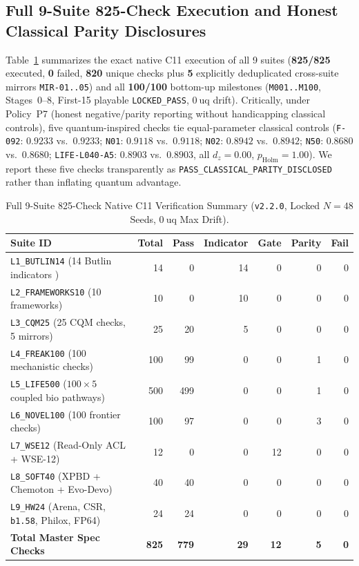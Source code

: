 \documentclass[11pt,reqno]{amsart}
\theoremstyle{remark}
\begin{document}
\subsection{Full 9-Suite 825-Check Execution and Honest Classical Parity Disclosures}
\label{subsec:suites}

Table~\ref{tab:suites} summarizes the exact native C11 execution of all 9 suites (\textbf{825/825} executed, \textbf{0} failed, \textbf{820} unique checks plus \textbf{5} explicitly deduplicated cross-suite mirrors \texttt{MIR-01..05}) and all \textbf{100/100} bottom-up milestones (\texttt{M001..M100}, Stages~0--8, First-15 playable \texttt{LOCKED\_PASS}, $0~\text{uq}$ drift). Critically, under Policy~P7 (honest negative/parity reporting without handicapping classical controls), five quantum-inspired checks tie equal-parameter classical controls (\texttt{F-092}: $0.9233$ vs.\ $0.9233$; \texttt{N01}: $0.9118$ vs.\ $0.9118$; \texttt{N02}: $0.8942$ vs.\ $0.8942$; \texttt{N50}: $0.8680$ vs.\ $0.8680$; \texttt{LIFE-L040-A5}: $0.8903$ vs.\ $0.8903$, all $d_z = 0.00$, $p_{\text{Holm}} = 1.00$). We report these five checks transparently as \texttt{PASS\_CLASSICAL\_PARITY\_DISCLOSED} rather than inflating quantum advantage.

\begin{table}[ht]
\centering
\caption{Full 9-Suite 825-Check Native C11 Verification Summary (\texttt{v2.2.0}, Locked $N=48$ Seeds, $0~\text{uq}$ Max Drift).}
\label{tab:suites}
\footnotesize
\setlength{\tabcolsep}{4pt}
\begin{tabular}{@{} l r r r r r r @{}}
\toprule
\textbf{Suite ID} & \textbf{Total} & \textbf{Pass} & \textbf{Indicator} & \textbf{Gate} & \textbf{Parity} & \textbf{Fail} \\
\midrule
\texttt{L1\_BUTLIN14} (14 Butlin indicators \cite{butlin2023}) & 14 & 0 & 14 & 0 & 0 & 0 \\
\texttt{L2\_FRAMEWORKS10} (10 frameworks) & 10 & 0 & 10 & 0 & 0 & 0 \\
\texttt{L3\_CQM25} (25 CQM checks, 5 mirrors) & 25 & 20 & 5 & 0 & 0 & 0 \\
\texttt{L4\_FREAK100} (100 mechanistic checks) & 100 & 99 & 0 & 0 & 1 & 0 \\
\texttt{L5\_LIFE500} ($100 \times 5$ coupled bio pathways) & 500 & 499 & 0 & 0 & 1 & 0 \\
\texttt{L6\_NOVEL100} (100 frontier checks) & 100 & 97 & 0 & 0 & 3 & 0 \\
\texttt{L7\_WSE12} (Read-Only ACL + WSE-12) & 12 & 0 & 0 & 12 & 0 & 0 \\
\texttt{L8\_SOFT40} (XPBD + Chemoton + Evo-Devo) & 40 & 40 & 0 & 0 & 0 & 0 \\
\texttt{L9\_HW24} (Arena, CSR, \texttt{b1.58}, Philox, FP64) & 24 & 24 & 0 & 0 & 0 & 0 \\
\midrule
\textbf{Total Master Spec Checks} & \textbf{825} & \textbf{779} & \textbf{29} & \textbf{12} & \textbf{5} & \textbf{0} \\
\bottomrule
\end{tabular}
\end{table}
\end{document}
